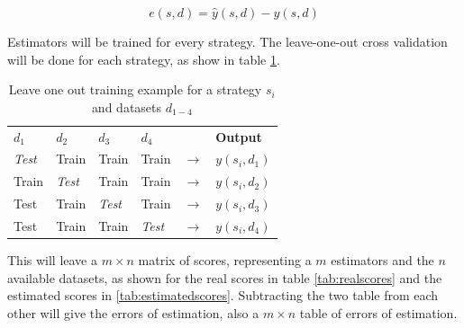 \begin{equation}
	e(s, d) = \hat{y}(s, d) - y(s, d)
\end{equation}

Estimators will be trained for every strategy. The leave-one-out cross validation will be done for each strategy, as show in table \ref{tab:leave-one-out}. 

\begin{table}%
\centering
\begin{tabular}{|l|l|l|l|l|l|}
\cline{1-4} \cline{6-6}
\textbf{$d_1$} & \textbf{$d_2$} & \textbf{$d_3$} & \textbf{$d_4$} &                 & \textbf{Output} \\ \cline{1-4} \cline{6-6} 
\textit{Test}          & Train         & Train         & Train         & $\rightarrow$ & $y(s_i, d_1)$      \\ \cline{1-4} \cline{6-6} 
Train         & \textit{Test}          & Train         & Train         & $\rightarrow$ & $y(s_i, d_2)$      \\ \cline{1-4} \cline{6-6} 
Test          & Train         & \textit{Test}          & Train         & $\rightarrow$ & $y(s_i, d_3)$     \\ \cline{1-4} \cline{6-6} 
Test          & Train         & Train         & \textit{Test}          & $\rightarrow$ & $y(s_i, d_4)$      \\ \cline{1-4} \cline{6-6} 
\end{tabular}
\caption{Leave one out training example for a strategy $s_i$ and datasets $d_{1-4}$}
\label{tab:leave-one-out}
\end{table}

This will leave a $m \times n$ matrix of scores, representing a $m$ estimators and the $n$ available datasets, as shown for the real scores in table \ref{tab:realscores} and the estimated scores in \ref{tab:estimatedscores}. Subtracting the two table from each other will give the errors of estimation, also a $m \times n$ table of errors of estimation.

